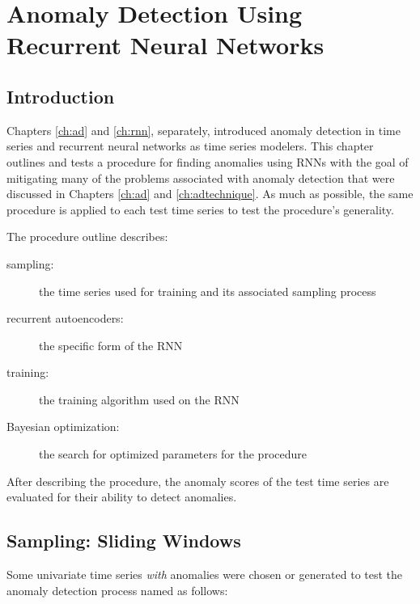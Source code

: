 \chapter{Anomaly Detection Using Recurrent Neural Networks}
\label{ch:results}


\section{Introduction}

Chapters \ref{ch:ad} and \ref{ch:rnn}, separately, introduced anomaly detection in time series and recurrent neural networks as time series modelers.
%
This chapter outlines and tests a procedure for finding anomalies using RNNs with the goal of mitigating many of the problems associated with anomaly detection that were discussed in Chapters \ref{ch:ad} and \ref{ch:adtechnique}.
%
As much as possible, the same procedure is applied to each test time series to test the procedure's generality.


The procedure outline describes:
%
\begin{description}
%
\item[sampling:] the time series used for training and its associated sampling process
%
\item[recurrent autoencoders:] the specific form of the RNN
%
\item[training:] the training algorithm used on the RNN
%
\item[Bayesian optimization:] the search for optimized parameters for the procedure
%
\end{description}
%
After describing the procedure, the anomaly scores of the test time series are evaluated for their ability to detect anomalies.


\section{Sampling: Sliding Windows}
\label{sec:sampling}


Some univariate time series \emph{with} anomalies were chosen or generated to test the anomaly detection process named as follows:

